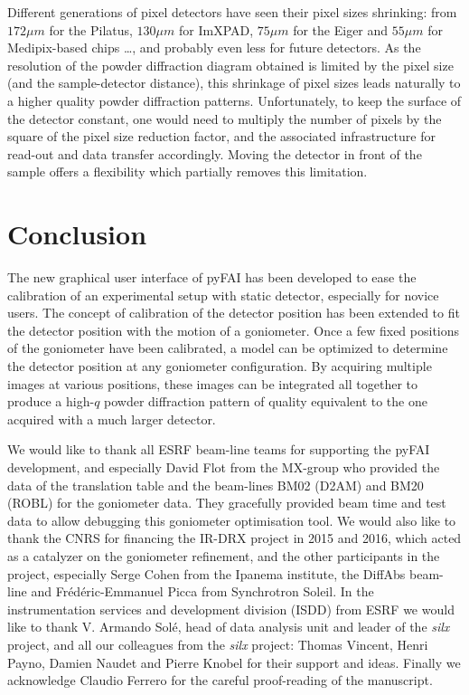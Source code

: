 \documentclass[preprint]{iucr}              %
\begin{document}
Different generations of pixel detectors have seen their pixel sizes
shrinking:
from $172 \mu m$ for the Pilatus, $130 \mu m$ for ImXPAD, $75 \mu m$ for the
Eiger and $55 \mu m$ for Medipix-based chips \ldots, and probably even less for
future detectors.
As the resolution of the powder diffraction diagram obtained is limited by the
pixel size (and the sample-detector distance), this shrinkage of
pixel sizes leads naturally to a higher quality powder
diffraction patterns.
Unfortunately, to keep the surface of the detector constant, one would need
to multiply the number of pixels by the square of the pixel size reduction
factor, and the associated infrastructure for read-out and data transfer
accordingly.
Moving the detector in front of the sample offers a flexibility which
partially removes this limitation.

\section{Conclusion}

The new graphical user interface of pyFAI has been developed to ease the
calibration of an experimental setup with static detector, especially for
novice users.
The concept of calibration of the detector position has been extended to fit
the detector position with the motion of a goniometer.   
Once a few fixed positions of the goniometer have been calibrated, a model can
be optimized to determine the detector position at any goniometer
configuration.
By acquiring multiple images at various positions, these images can be
integrated all together to produce a high-$q$ powder diffraction pattern of
quality equivalent to the one acquired with a much larger detector. 
 

We would like to thank all ESRF beam-line teams for supporting the
pyFAI development, and especially David Flot from the MX-group who provided the
data of the translation table and the beam-lines BM02 (D2AM) and BM20
(ROBL) for the goniometer data. 
They gracefully provided beam time and test data to allow debugging this 
goniometer optimisation tool.
We would also like to thank the CNRS for financing the IR-DRX project
in 2015 and 2016, which acted as a catalyzer on the goniometer refinement,
and the other participants in the project, especially Serge Cohen from the
Ipanema institute, the DiffAbs beam-line and Frédéric-Emmanuel Picca from
Synchrotron Soleil.
In the instrumentation services and development division (ISDD) from ESRF  we
would like to thank V. Armando Solé, head of data analysis unit and leader of 
the \textit{silx} project, and all our colleagues from the \textit{silx}
project:
Thomas Vincent, Henri Payno, Damien Naudet and  Pierre Knobel for their support and ideas. 
Finally we acknowledge Claudio Ferrero for the careful proof-reading of the
manuscript. 



\end{document}
